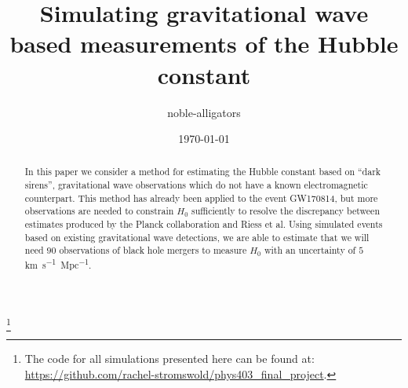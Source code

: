 \documentclass[a4paper, amsfonts, amssymb, amsmath, reprint, showkeys, nofootinbib, twoside]{revtex4-1}
\begin{document}
\title{Simulating gravitational wave based measurements of the Hubble constant}

\author{noble-alligators}

\date{\today} %

\begin{abstract}
  In this paper we consider a method for estimating the Hubble constant based on ``dark sirens'', gravitational wave observations which do not have a known electromagnetic counterpart. This method has already been applied to the event GW170814, but more observations are needed to constrain $H_0$ sufficiently to resolve the discrepancy between estimates produced by the Planck collaboration and Riess et al. Using simulated events based on existing gravitational wave detections, we are able to estimate that we will need $90$ observations of black hole mergers  to measure $H_0$ with an uncertainty of $5$ \si{km.s^{-1}.Mpc^{-1}}.
\end{abstract}


\footnote{The code for all simulations presented here can be found at: \href{https://github.com/rachel-stromswold/phys403_final_project}{\url{https://github.com/rachel-stromswold/phys403_final_project}}.}

\maketitle




%


%

%
%



\end{document}

